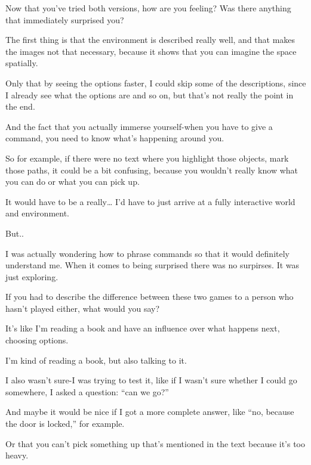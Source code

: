 \begin{QandA}
   \item Now that you’ve tried both versions, how are you feeling? Was there anything that immediately surprised you?
         \begin{answered}
            The first thing is that the environment is described really well, and that makes the images not that necessary, because it shows that you can imagine the space spatially.

            Only that by seeing the options faster, I could skip some of the descriptions, since I already see what the options are and so on, but that’s not really the point in the end.

            And the fact that you actually immerse yourself-when you have to give a command, you need to know what’s happening around you.

            So for example, if there were no text where you highlight those objects, mark those paths, it could be a bit confusing, because you wouldn’t really know what you can do or what you can pick up.

            It would have to be a really… I’d have to just arrive at a fully interactive world and environment. 

            But..

            I was actually wondering how to phrase commands so that it would definitely understand me.
            When it comes to being surprised there was no surpirses. It was just exploring.
                  \end{answered}

   \item If you had to describe the difference between these two games to a person who hasn't played either, what would you say?
         \begin{answered}
            It’s like I’m reading a book and have an influence over what happens next, choosing options.

            I’m kind of reading a book, but also talking to it.

            I also wasn’t sure-I was trying to test it, like if I wasn’t sure whether I could go somewhere, I asked a question: “can we go?”

            And maybe it would be nice if I got a more complete answer, like “no, because the door is locked,” for example.

            Or that you can’t pick something up that’s mentioned in the text because it’s too heavy.


\end{answered}
\end{QandA}
